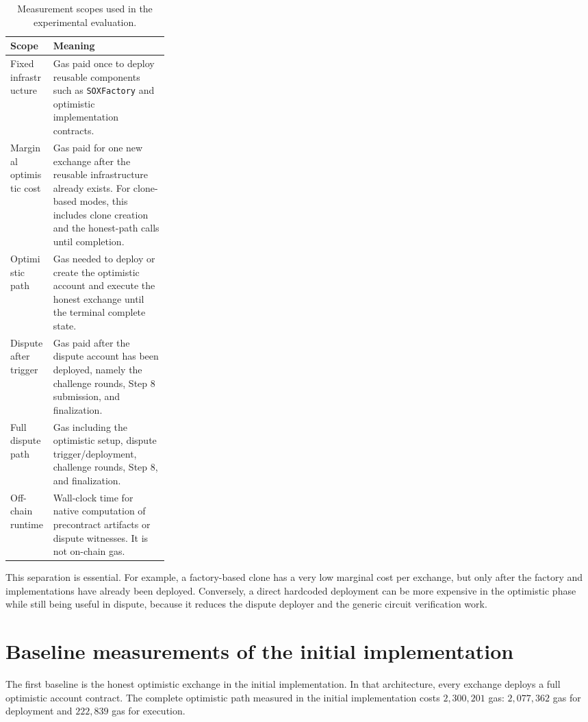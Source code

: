 \begin{table}[htbp]
  \centering
  \begin{tabularx}{\linewidth}{>{\raggedright\arraybackslash}p{0.27\linewidth}>{\raggedright\arraybackslash}X}
    \toprule
    Scope & Meaning \\
    \midrule
    Fixed infrastructure &
    Gas paid once to deploy reusable components such as \texttt{SOXFactory} and optimistic
    implementation contracts. \\
    Marginal optimistic cost &
    Gas paid for one new exchange after the reusable infrastructure already exists. For
    clone-based modes, this includes clone creation and the honest-path calls until
    completion. \\
    Optimistic path &
    Gas needed to deploy or create the optimistic account and execute the honest exchange
    until the terminal complete state. \\
    Dispute after trigger &
    Gas paid after the dispute account has been deployed, namely the challenge rounds,
    Step 8 submission, and finalization. \\
    Full dispute path &
    Gas including the optimistic setup, dispute trigger/deployment, challenge rounds,
    Step 8, and finalization. \\
    Off-chain runtime &
    Wall-clock time for native computation of precontract artifacts or dispute witnesses.
    It is not on-chain gas. \\
    \bottomrule
  \end{tabularx}
  \caption{Measurement scopes used in the experimental evaluation.}
  \label{tab:measurement-scopes}
\end{table}

This separation is essential. For example, a factory-based clone has a very low marginal
cost per exchange, but only after the factory and implementations have already been
deployed. Conversely, a direct hardcoded deployment can be more expensive in the optimistic
phase while still being useful in dispute, because it reduces the dispute deployer and the
generic circuit verification work.

\section[Baseline measurements]{Baseline measurements of the initial implementation}

The first baseline is the honest optimistic exchange in the initial implementation. In that
architecture, every exchange deploys a full optimistic account contract. The complete
optimistic path measured in the initial implementation costs \(2,300,201\) gas: \(2,077,362\)
gas for deployment and \(222,839\) gas for execution.

